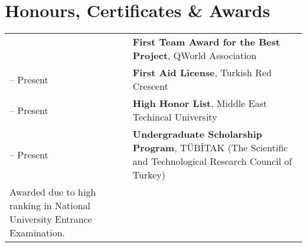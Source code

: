 \documentclass[11pt]{article} %
\makeatletter
\newlength{\firstColumnWidth}
\newlength{\tabusep}
\newenvironment{twocols}
    {
    \begin{longtable}[h]{%
        @{}%
        >{\raggedleft}p{\firstColumnWidth}%
        @{\hspace{\tabusep}}%
        >{\arraybackslash\raggedright}p{\dimexpr %
            \linewidth-\firstColumnWidth-\tabusep%
        \relax}%
        @{}%
        }
    } {
        \end{longtable}
    }
\makeatother
\begin{document}
\section{Honours, Certificates \& Awards}
\vspace{-.5em}
\renewcommand*{\arraystretch}{1.5}

\begin{twocols}
    2020 & \textbf{First Team Award for the Best Project}, QWorld Association \tabularnewline
    2018 -- Present & \textbf{First Aid License}, Turkish Red Crescent \tabularnewline
    2017 -- Present & \textbf{High Honor List}, Middle East Techincal University \tabularnewline
    2017 -- Present & %
        \textbf{Undergraduate Scholarship Program}, TÜBİTAK (The Scientific and Technological Research Council of Turkey)\\
        Awarded due to high ranking in National University Entrance Examination.
\end{twocols}
\end{document}
